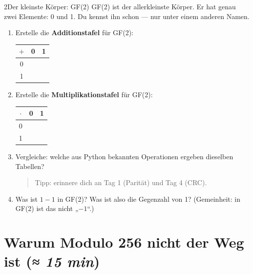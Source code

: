 \begin{bleistiftuebung}{2}{Der kleinste Körper: GF(2)}
GF(2) ist der allerkleinste Körper. Er hat genau zwei Elemente: 0 und
1. Du kennst ihn schon — nur unter einem anderen Namen.

\begin{enumerate}[label=(\alph*), leftmargin=*]
\item Erstelle die \textbf{Additionstafel} für GF(2):

  \begin{center}
  \begin{tabular}{c|cc}
    $+$ & 0 & 1 \\
    \hline
    0 & & \\
    1 & & \\
  \end{tabular}
  \end{center}

\item Erstelle die \textbf{Multiplikationstafel} für GF(2):

  \begin{center}
  \begin{tabular}{c|cc}
    $\cdot$ & 0 & 1 \\
    \hline
    0 & & \\
    1 & & \\
  \end{tabular}
  \end{center}

\item Vergleiche: welche aus Python bekannten Operationen ergeben
  dieselben Tabellen?

  \begin{quote}
  Tipp: erinnere dich an Tag 1 (Parität) und Tag 4 (CRC).
  \end{quote}

\item Was ist $1 - 1$ in GF(2)? Was ist also die Gegenzahl von 1?
  (Gemeinheit: in GF(2) ist das nicht „$-1$“.)
\end{enumerate}
\end{bleistiftuebung}

\section{Warum Modulo 256 nicht der Weg ist \normalfont(\textit{≈ 15 min})}

